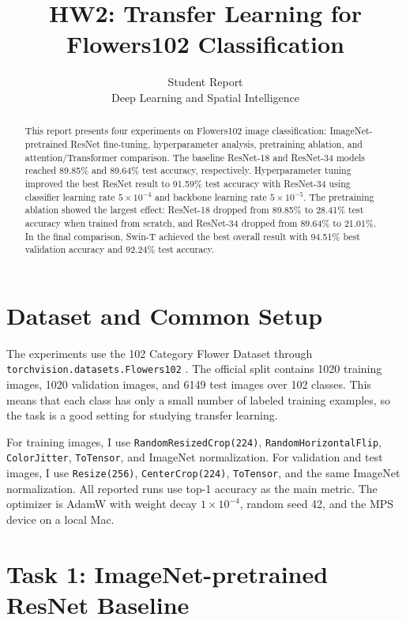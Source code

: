\documentclass{article}
\title{HW2: Transfer Learning for Flowers102 Classification}
\author{%
  Student Report\\
  Deep Learning and Spatial Intelligence\\
}
\begin{document}
\maketitle

\begin{abstract}
This report presents four experiments on Flowers102 image classification: ImageNet-pretrained ResNet fine-tuning, hyperparameter analysis, pretraining ablation, and attention/Transformer comparison. The baseline ResNet-18 and ResNet-34 models reached 89.85\% and 89.64\% test accuracy, respectively. Hyperparameter tuning improved the best ResNet result to 91.59\% test accuracy with ResNet-34 using classifier learning rate $5\times10^{-4}$ and backbone learning rate $5\times10^{-5}$. The pretraining ablation showed the largest effect: ResNet-18 dropped from 89.85\% to 28.41\% test accuracy when trained from scratch, and ResNet-34 dropped from 89.64\% to 21.01\%. In the final comparison, Swin-T achieved the best overall result with 94.51\% best validation accuracy and 92.24\% test accuracy.
\end{abstract}

\section{Dataset and Common Setup}

The experiments use the 102 Category Flower Dataset through \texttt{torchvision.datasets.Flowers102} \citep{nilsback2008flowers}. The official split contains 1020 training images, 1020 validation images, and 6149 test images over 102 classes. This means that each class has only a small number of labeled training examples, so the task is a good setting for studying transfer learning.

For training images, I use \texttt{RandomResizedCrop(224)}, \texttt{RandomHorizontalFlip}, \texttt{ColorJitter}, \texttt{ToTensor}, and ImageNet normalization. For validation and test images, I use \texttt{Resize(256)}, \texttt{CenterCrop(224)}, \texttt{ToTensor}, and the same ImageNet normalization. All reported runs use top-1 accuracy as the main metric. The optimizer is AdamW with weight decay $1\times10^{-4}$, random seed 42, and the MPS device on a local Mac.

\section{Task 1: ImageNet-pretrained ResNet Baseline}
\end{document}
